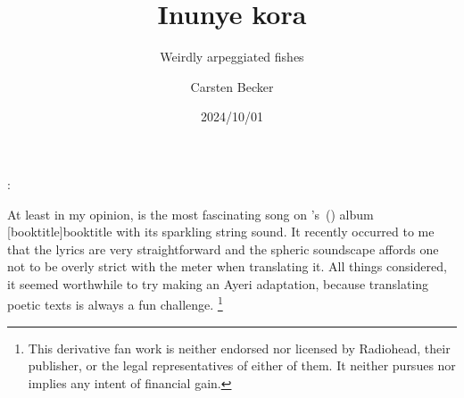 \documentclass[12pt,paper=a4]{scrartcl}
\author{Carsten Becker}
\title{Inunye kora}
\subtitle{Weirdly arpeggiated fishes}
\date{2024/10/01} %
\newenvironment{mytitle}{
	\hfill
	\begin{minipage}{0.667\textwidth}
	\vspace{\baselineskip}
	\begin{center}
		\Large
		\sffamily\bfseries
		\makeatletter
}{
		\makeatother
	\end{center}
	\vspace{1em}
	\end{minipage}
	\hfill
}
\begin{document}

\begin{mytitle}
	\@title: \@subtitle
\end{mytitle}

At least in my opinion,  is the most
fascinating song on
\citeauthor{radiohead:weirdfishes}'s~(\citeyear{radiohead:weirdfishes}) album
[booktitle]{booktitle} with its sparkling
string sound. It recently occurred to me that the lyrics are very
straightforward and the spheric soundscape affords one not to be overly strict
with the meter when translating it. All things considered, it seemed worthwhile
to try making an Ayeri adaptation, because translating poetic texts is always a
fun challenge.%
%
	\footnote{This derivative fan work is neither endorsed nor licensed by
	Radiohead, their publisher, or the legal representatives of either of them.
	It neither pursues nor implies any intent of financial gain.}
\end{document}
